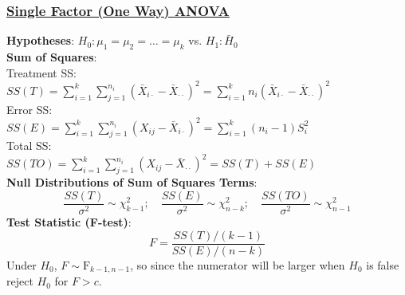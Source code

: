 \documentclass{article}
\begin{document}
\begin{multicols*}{2}
\subsubsection*{\underline{Single Factor (One Way) ANOVA}}
\textbf{Hypotheses}: $H_{0}: \mu_{1} = \mu_{2} = \dots = \mu_{k}$ vs. $H_{1}: \bar{H}_{0}$\\
\textbf{Sum of Squares}:\\
Treatment SS:\\
$SS(T) = \sum_{i=1}^{k} \sum_{j=1}^{n_{i}} (\bar{X}_{i\cdot} - \bar{X}_{\cdot \cdot})^{2} = \sum_{i=1}^{k} n_{i} (\bar{X}_{i\cdot} - \bar{X}_{\cdot \cdot})^{2}$\\
Error SS:\\
$SS(E) = \sum_{i=1}^{k} \sum_{j=1}^{n_{i}} (X_{ij} - \bar{X}_{i\cdot})^{2} = \sum_{i=1}^{k} (n_{i} - 1) S_{i}^{2}$\\
Total SS:\\
$SS(TO) = \sum_{i=1}^{k} \sum_{j=1}^{n_{i}} (X_{ij} - \bar{X}_{\cdot \cdot})^{2} = SS(T) + SS(E)$\\
\textbf{Null Distributions of Sum of Squares Terms}:
$$\frac{SS(T)}{\sigma^{2}} \sim \chi^{2}_{k-1}; \quad \frac{SS(E)}{\sigma^{2}} \sim \chi^{2}_{n-k}; \quad \frac{SS(TO)}{\sigma^{2}} \sim \chi^{2}_{n-1}$$
\textbf{Test Statistic (F-test)}:
$$F = \frac{SS(T) / (k-1)}{SS(E) / (n-k)}$$
Under $H_{0}$, $F \sim \mbox{F}_{k-1, n-1}$, so since the numerator will be larger when $H_{0}$ is false reject $H_{0}$ for $F > c$.


\end{multicols*}
\end{document}

